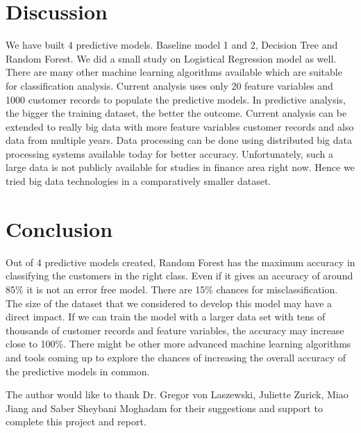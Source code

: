\documentclass[sigconf]{acmart}
\begin{document}
\section{Discussion}

We have built 4 predictive models. Baseline model 1 and 2, Decision Tree and Random Forest. We did a small study on Logistical Regression model as well. There are many other machine learning algorithms available which are suitable for classification analysis. Current analysis uses only 20 feature variables and 1000 customer records to populate the predictive models. In predictive analysis, the bigger the training dataset, the better the outcome. Current analysis can be extended to really big data with more feature variables customer records and also data from multiple years. Data processing can be done using distributed big data processing systems available today for better accuracy. Unfortunately, such a large data is not publicly available for studies in finance area right now. Hence we tried big data technologies in a comparatively smaller dataset. 


\section{Conclusion}

Out of 4 predictive models created, Random Forest has the maximum accuracy in classifying the customers in the right class. Even if it gives an accuracy of around 85\% it is not an error free model. There are 15\% chances for misclassification. The size of the dataset that we considered to develop this model may have a direct impact. If we can train the model with a larger data set with tens of thousands of customer records and feature variables, the accuracy may increase close to 100\%. There might be other more advanced machine learning algorithms and tools coming up to explore the chances of increasing the overall accuracy of the predictive models in common.


\begin{acks}

The author would like to thank Dr. Gregor von Laszewski, Juliette Zurick, Miao Jiang and Saber Sheybani Moghadam for their suggestions and support to complete this project and report.

\end{acks}


 

\appendix
\end{document}
